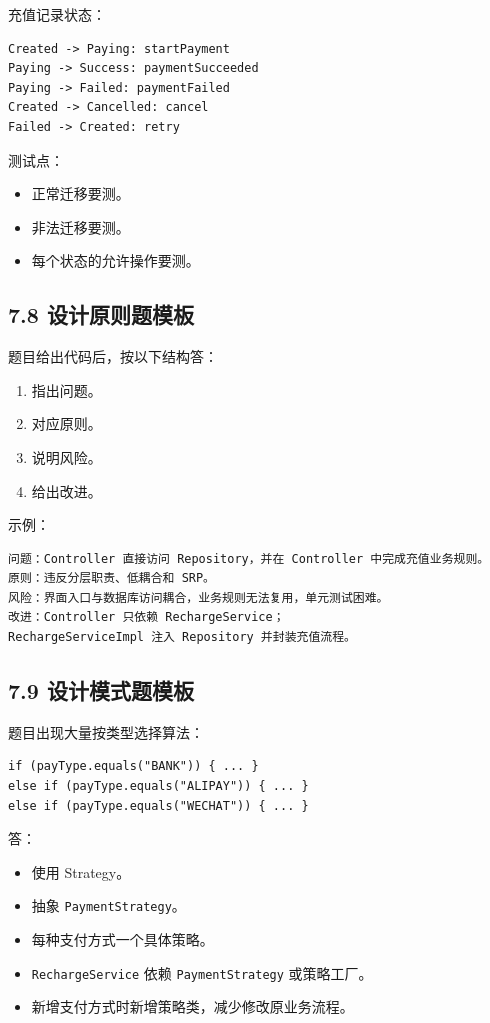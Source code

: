 \documentclass[UTF8,zihao=-4]{ctexart}
\begin{document}
充值记录状态：

\small
\begin{verbatim}
Created -> Paying: startPayment
Paying -> Success: paymentSucceeded
Paying -> Failed: paymentFailed
Created -> Cancelled: cancel
Failed -> Created: retry
\end{verbatim}
\normalsize

测试点：

\begin{itemize}
\item 正常迁移要测。
\item 非法迁移要测。
\item 每个状态的允许操作要测。
\end{itemize}

\subsection{7.8 设计原则题模板}

题目给出代码后，按以下结构答：

\begin{enumerate}
\item 指出问题。
\item 对应原则。
\item 说明风险。
\item 给出改进。
\end{enumerate}

示例：

\small
\begin{verbatim}
问题：Controller 直接访问 Repository，并在 Controller 中完成充值业务规则。
原则：违反分层职责、低耦合和 SRP。
风险：界面入口与数据库访问耦合，业务规则无法复用，单元测试困难。
改进：Controller 只依赖 RechargeService；
RechargeServiceImpl 注入 Repository 并封装充值流程。
\end{verbatim}
\normalsize

\subsection{7.9 设计模式题模板}

题目出现大量按类型选择算法：

\small
\begin{verbatim}
if (payType.equals("BANK")) { ... }
else if (payType.equals("ALIPAY")) { ... }
else if (payType.equals("WECHAT")) { ... }
\end{verbatim}
\normalsize

答：

\begin{itemize}
\item 使用 Strategy。
\item 抽象 \texttt{PaymentStrategy}。
\item 每种支付方式一个具体策略。
\item \texttt{RechargeService} 依赖 \texttt{PaymentStrategy} 或策略工厂。
\item 新增支付方式时新增策略类，减少修改原业务流程。
\end{itemize}
\end{document}
